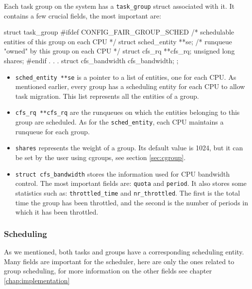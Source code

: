 Each task group on the system has a \verb|task_group| struct associated with it. It contains a few crucial fields, the most important are:
\begin{code}
struct task_group {
	#ifdef CONFIG_FAIR_GROUP_SCHED
	/* schedulable entities of this group on each CPU */
	struct sched_entity	**se;
	/* runqueue "owned" by this group on each CPU */
	struct cfs_rq		**cfs_rq;
	unsigned long		shares;
	#endif
	.
	.
	.
	struct cfs_bandwidth	cfs_bandwidth;
};
\end{code}

\begin{itemize}
    \item \verb|sched_entity **se| is a pointer to a list of entities, one for each CPU. As mentioned earlier, every group has a scheduling entity for each CPU to allow task migration. This list represents all the entities of a group.
    \item \verb|cfs_rq **cfs_rq| are the runqueues on which the entities belonging to this group are scheduled. As for the \verb|sched_entity|, each CPU maintains a runqueue for each group.
    \item \verb|shares| represents the weight of a group. Its default value is 1024, but it can be set by the user using cgroups, see section \ref{sec:cgroup}.
    \item \verb|struct cfs_bandwidth| stores the information used for CPU bandwidth control. The most important fields are: \verb|quota| and \verb|period|. It also stores some statistics such as: \verb|throttled_time| and \verb|nr_throttled|. The first is the total time the group has been throttled, and the second is the number of periods in which it has been throttled.
\end{itemize}

\subsubsection{Scheduling}

As we mentioned, both tasks and groups have a corresponding scheduling entity. Many fields are important for the scheduler, here are only the ones related to group scheduling, for more information on the other fields see chapter \ref{chap:implementation}

